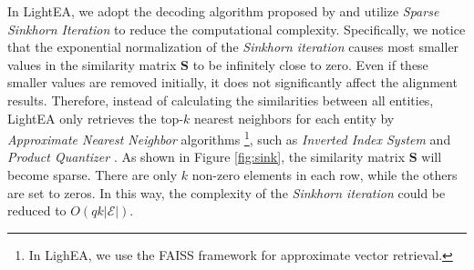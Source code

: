 \documentclass[11pt]{article}
\begin{document}
In LightEA, we adopt the decoding algorithm proposed by \citet{Mao2022AnEA} and utilize \emph{Sparse Sinkhorn Iteration} to reduce the computational complexity.
Specifically, we notice that the exponential normalization of the \emph{Sinkhorn iteration} causes most smaller values in the similarity matrix $\bm S$ to be infinitely close to zero.
Even if these smaller values are removed initially, it does not significantly affect the alignment results.
Therefore, instead of calculating the similarities between all entities, LightEA only retrieves the top-$k$ nearest neighbors for each entity by \emph{Approximate Nearest Neighbor} algorithms \footnote{In LighEA, we use the FAISS framework \cite{johnson2019billion} for approximate vector retrieval.}, such as \emph{Inverted Index System} and \emph{Product Quantizer} \cite{DBLP:journals/pami/JegouDS11}.
As shown in Figure \ref{fig:sink}, the similarity matrix $\bm S$ will become sparse.
There are only $k$ non-zero elements in each row, while the others are set to zeros.
In this way, the complexity of the \emph{Sinkhorn iteration} could be reduced to $O(qk|\mathcal{E}|)$.
\end{document}
